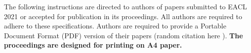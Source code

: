 
The following instructions are directed to authors of papers submitted to EACL 2021 or accepted for publication in its proceedings.
All authors are required to adhere to these specifications.
Authors are required to provide a Portable Document Format (PDF) version of their papers (random citation here \citep{Gusfield:97}).
\textbf{The proceedings are designed for printing on A4 paper.}

